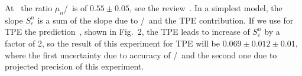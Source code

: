 At  \gevcsq~the ratio $\mu_n$\gen/\gmn~is of $0.55 \pm 0.05$, see the review~\cite{Punjabi:2015bba}.
%
In a simplest model, the slope $S_c^n$ is a sum of the slope due to \gen/\gmn~and the TPE contribution.
If we use for TPE the prediction~\cite{Blunden:2005ew}, shown in Fig.~2, the TPE leads to increase of $S_c^n$ by a factor of 2,
so the result of this experiment for TPE will be $0.069 \pm 0.012 \pm 0.01$, where the first uncertainty due to accuracy 
of \gen/\gmn~and the second one due to projected precision of this experiment.







